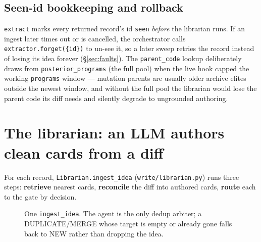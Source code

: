 \documentclass[11pt]{article}
\newcommand{\code}[1]{\texttt{\small #1}}
\begin{document}
\subsection{Seen-id bookkeeping and rollback}

\code{extract} marks every returned record's id \code{seen} \emph{before} the
librarian runs. If an ingest later times out or is cancelled, the orchestrator
calls \code{extractor.forget(\{id\})} to un-see it, so a later sweep retries the
record instead of losing its idea forever (\S\ref{sec:faults}). The
\code{parent\_code} lookup deliberately draws from \code{posterior\_programs}
(the full pool) when the live hook capped the working \code{programs} window ---
mutation parents are usually older archive elites outside the newest window, and
without the full pool the librarian would lose the parent code its diff needs and
silently degrade to ungrounded authoring.

\section{The librarian: an LLM authors clean cards from a diff}
\label{sec:librarian}

For each record, \code{Librarian.ingest\_idea} (\code{write/librarian.py}) runs
three steps: \textbf{retrieve} nearest cards, \textbf{reconcile} the diff into
authored cards, \textbf{route} each to the gate by decision.

\begin{figure}[ht]
\centering
{}
\caption{One \code{ingest\_idea}. The agent is the only dedup arbiter; a
DUPLICATE/MERGE whose target is empty or already gone falls back to NEW rather
than dropping the idea.}
\label{fig:ingest}
\end{figure}
\end{document}
